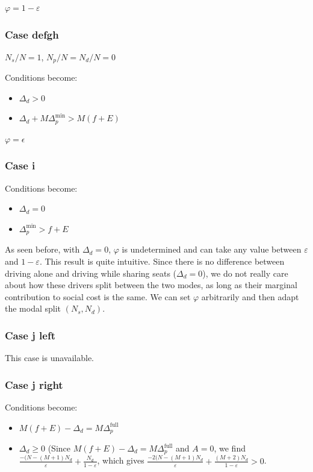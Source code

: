 \documentclass[english, a4paper]{article}
\theoremstyle{plain}
\theoremstyle{definition}
\theoremstyle{remark}
\begin{document}
    $\varphi = 1- \varepsilon$

    \subsubsection{Case defgh}

    $N_s / N = 1$, $N_p / N = N_d / N = 0$
    
    Conditions become:
    \begin{itemize}
        \item $\Delta_d >0$
        \item $\Delta_d + M\Delta_p^{\text{min}} > M(f+E)$
    \end{itemize}

    $\varphi = \epsilon$

    \subsubsection{Case i}
    Conditions become:
    \begin{itemize}
        \item $\Delta_d = 0$
        \item $\Delta_p^{\text{min}} > f + E$
    \end{itemize}

    As seen before, with $\Delta_d = 0$, $\varphi$ is undetermined and can take any value between $\varepsilon$ and $1 - \varepsilon$. This result is quite intuitive. Since there is no difference between driving alone and driving while sharing seats ($\Delta_d = 0$), we do not really care about how these drivers split between the two modes, as long as their marginal contribution to social cost is the same. We can set $\varphi$ arbitrarily and then adapt the modal split $(N_s, N_d)$.

    \subsubsection{Case j left}
    This case is unavailable.

    \subsubsection{Case j right}
    
    Conditions become:
    \begin{itemize}
        \item $M(f + E) - \Delta_d = M \Delta_p^{\text{full}}$
        \item $\Delta_d \geq 0$ (Since $M(f + E) - \Delta_d = M \Delta_p^{\text{full}}$ and $A = 0$, we find $\frac{-(N - (M + 1)N_d}{\varepsilon} + \frac{N_d}{1 - \varepsilon}$, which gives $\frac{-2(N - (M + 1)N_d}{\varepsilon} + \frac{(M + 2)N_d}{1 - \varepsilon} > 0$.
    \end{itemize}
\end{document}
